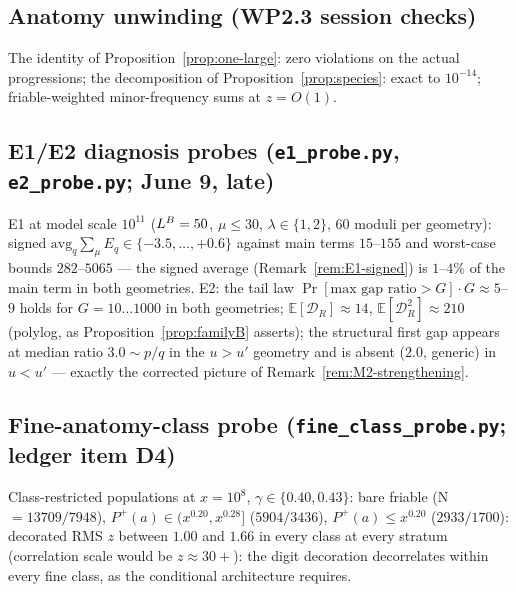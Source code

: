 \subsection*{Anatomy unwinding (WP2.3 session checks)}
The identity of Proposition~\ref{prop:one-large}: zero violations on the
actual progressions; the decomposition of
Proposition~\ref{prop:species}: exact to $10^{-14}$; friable-weighted
minor-frequency sums at $z=O(1)$.

\subsection*{E1/E2 diagnosis probes (\texttt{e1\_probe.py},
\texttt{e2\_probe.py}; June 9, late)}
E1 at model scale $10^{11}$ ($L^B=50$, $\mu\le30$,
$\lambda\in\{1,2\}$, 60 moduli per geometry): signed
$\mathrm{avg}_q\sum_\mu E_q\in\{-3.5,\ldots,+0.6\}$ against main terms
$15$--$155$ and worst-case bounds $282$--$5065$ --- the signed average
(Remark~\ref{rem:E1-signed}) is $1$--$4\%$ of the main term in both
geometries. E2: the tail law
$\Pr[\text{max gap ratio}>G]\cdot G\approx5$--$9$ holds for
$G=10\ldots1000$ in both geometries; $\mathbb E[\mathcal D_R]\approx14$,
$\mathbb E[\mathcal D_R^2]\approx210$ (polylog, as
Proposition~\ref{prop:familyB} asserts); the structural first gap
appears at median ratio $3.0\sim p/q$ in the $u>u'$ geometry and is
absent ($2.0$, generic) in $u<u'$ --- exactly the corrected picture of
Remark~\ref{rem:M2-strengthening}.

\subsection*{Fine-anatomy-class probe (\texttt{fine\_class\_probe.py};
ledger item D4)}
Class-restricted populations at $x=10^8$, $\gamma\in\{0.40,0.43\}$:
bare friable (N $=13709/7948$), $P^+(a)\in(x^{0.20},x^{0.28}]$
($5904/3436$), $P^+(a)\le x^{0.20}$ ($2933/1700$): decorated RMS $z$
between $1.00$ and $1.66$ in every class at every stratum
(correlation scale would be $z\approx30+$): the digit decoration
decorrelates within every fine class, as the conditional architecture
requires.

